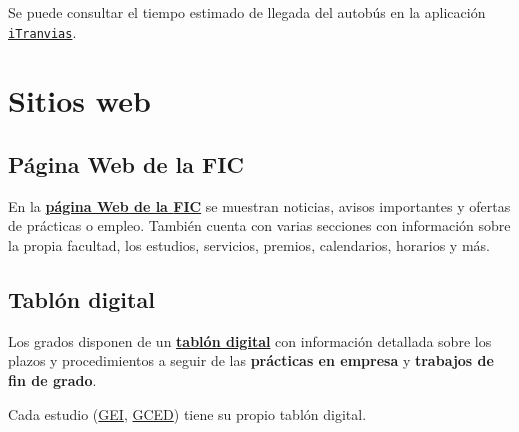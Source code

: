 \begin{infoBox}
    Se puede consultar el tiempo estimado de llegada del autobús en la aplicación \href{https://tranviascoruna.com/}{\texttt{iTranvias}}.
\end{infoBox}


\section{Sitios web}

\subsection{Página Web de la FIC}

En  la \href{https://www.fic.udc.es/}{\textbf{página Web de la \acrshort{FIC}}} se muestran noticias, avisos importantes y ofertas de prácticas o empleo. También cuenta con varias secciones con información sobre la propia facultad, los estudios, servicios, premios, calendarios, horarios y más.

\FloatBarrier
\begin{figure}[htp]
    \centering
\end{figure}
\FloatBarrier

\subsection{Tablón digital}

Los grados disponen de un \textbf{\href{https://taboleirofic.udc.es/}{tablón digital}} con información detallada sobre los plazos y procedimientos a seguir de las \textbf{prácticas en empresa} y \textbf{trabajos de fin de grado}.

\begin{infoBox}
    Cada estudio (\href{\linkTaboleiroGEI}{\acrshort{GEI}}, \href{\linkTaboleiroGCED}{\acrshort{GCED}}) tiene su propio tablón digital.
\end{infoBox}

